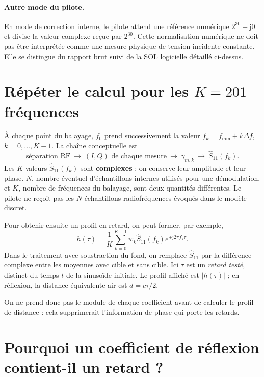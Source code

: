 \documentclass[11pt,a4paper]{article}
\newcommand{\jj}{\mathrm{j}}
\begin{document}
\paragraph{Autre mode du pilote.}
En mode de correction interne, le pilote attend une référence numérique
$2^{30}+\jj0$ et divise la valeur complexe reçue par $2^{30}$. Cette
normalisation numérique ne doit pas être interprétée comme une mesure
physique de tension incidente constante. Elle se distingue du rapport
brut suivi de la SOL logicielle détaillé ci-dessus.

\section{Répéter le calcul pour les \texorpdfstring{$K=201$}{K=201} fréquences}
À chaque point du balayage, $f_0$ prend successivement la valeur
$f_k=f_{\min}+k\Delta f$, $k=0,\ldots,K-1$. La chaîne conceptuelle est
\begin{equation}
 \boxed{\text{séparation RF}\ \longrightarrow\ (I,Q)\text{ de chaque mesure}
 \ \longrightarrow\ \gamma_{m,k}\ \longrightarrow\ \widehat S_{11}(f_k).}
\end{equation}
Les $K$ valeurs $\widehat S_{11}(f_k)$ sont \textbf{complexes} : on conserve
leur amplitude et leur phase. $N$, nombre éventuel d'échantillons internes
utilisés pour une démodulation, et $K$, nombre de fréquences du balayage,
sont deux quantités différentes. Le pilote ne reçoit pas les $N$
échantillons radiofréquences évoqués dans le modèle discret.

Pour obtenir ensuite un profil en retard, on peut former, par exemple,
\begin{equation}
 h(\tau)=\frac{1}{K}\sum_{k=0}^{K-1}w_k\widehat S_{11}(f_k)
 e^{+\jj2\pi f_k\tau}.
\end{equation}
Dans le traitement avec soustraction du fond, on remplace $\widehat S_{11}$
par la différence complexe entre les moyennes avec cible et sans cible.
Ici $\tau$ est un \emph{retard testé}, distinct du temps $t$ de la
sinusoïde initiale. Le profil affiché est $|h(\tau)|$ ; en réflexion, la
distance équivalente air est $d=c\tau/2$.

On ne prend donc pas le module de chaque coefficient avant de
calculer le profil de distance : cela supprimerait l'information de phase
qui porte les retards.

\section{Pourquoi un coefficient de réflexion contient-il un retard ?}
\end{document}

